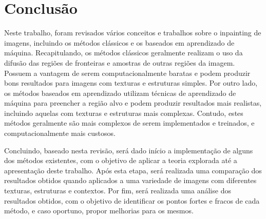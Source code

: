 
\section{Conclusão} \label{conclusion}
Neste trabalho, foram revisados vários conceitos e trabalhos sobre o inpainting de imagens, incluindo os métodos clássicos e os baseados em aprendizado de máquina. Recapitulando, os métodos clássicos geralmente realizam o uso da difusão das regiões de fronteiras e amostras de outras regiões da imagem. Possuem a vantagem de serem computacionalmente baratas e podem produzir bons resultados para imagens com texturas e estruturas simples. Por outro lado, os métodos baseados em aprendizado utilizam técnicas de aprendizado de máquina para preencher a região alvo e podem produzir resultados mais realistas, incluindo aquelas com texturas e estruturas mais complexas. Contudo, estes métodos geralmente são mais complexos de serem implementados e treinados, e computacionalmente mais custosos.

Concluindo, baseado nesta revisão, será dado início a implementação de alguns dos métodos existentes, com o objetivo de aplicar a teoria explorada até a apresentação deste trabalho. Após esta etapa, será realizada uma comparação dos resultados obtidos quando aplicados a uma variedade de imagens com diferentes texturas, estruturas e contextos. Por fim, será realizada uma análise dos resultados obtidos, com o objetivo de identificar os pontos fortes e fracos de cada método, e caso oportuno, propor melhorias para os mesmos.